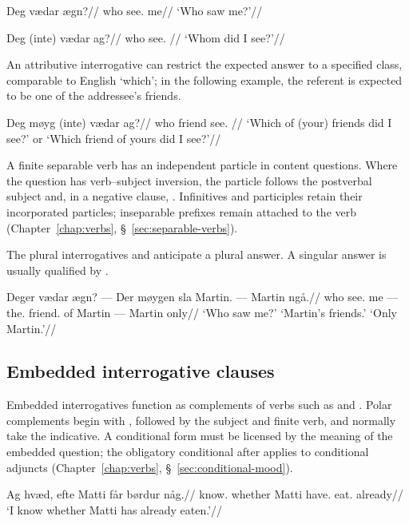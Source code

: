 \pex
\begingl
\gla Deg vædar ægn?//
\glb who see.\Pst{} me//
\glft `Who saw me?'//
\endgl
\xe

\pex
\begingl
\gla Deg (inte) vædar ag?//
\glb who \Q{} see.\Pst{} \First{}\Sg{}//
\glft `Whom did I see?'//
\endgl
\xe

An attributive interrogative can restrict the expected answer to a specified class, comparable to English `which'; in the following example, the referent is expected to be one of the addressee's friends.

\pex
\begingl
\gla Deg møyg (inte) vædar ag?//
\glb who friend \Q{} see.\Pst{} \First{}\Sg{}//
\glft `Which of (your) friends did I see?' or `Which friend of yours did I see?'//
\endgl
\xe

A finite separable verb has an independent particle in content questions. Where the question has verb--subject inversion, the particle follows the postverbal subject and, in a negative clause, . Infinitives and participles retain their incorporated particles; inseparable prefixes remain attached to the verb (Chapter~\ref{chap:verbs}, \S~\ref{sec:separable-verbs}).

The plural interrogatives  and  anticipate a plural answer. A singular answer is usually qualified by .

\pex
\begingl
\gla Deger vædar ægn? --- Der møygen sla Martin. --- Martin ngå.//
\glb who see.\Pst{} me --- the.\Pl{} friend.\Pl{} of Martin --- Martin only//
\glft `Who saw me?' `Martin's friends.' `Only Martin.'//
\endgl
\xe


\subsection{Embedded interrogative clauses}
\label{sec:embedded-interrogatives}

Embedded interrogatives function as complements of verbs such as  and . Polar complements begin with , followed by the subject and finite verb, and normally take the indicative. A conditional form must be licensed by the meaning of the embedded question; the obligatory conditional after  applies to conditional adjuncts (Chapter~\ref{chap:verbs}, \S~\ref{sec:conditional-mood}).

\pex
\begingl
\gla Ag hvæd, efte Matti får børdur någ.//
\glb \First{}\Sg{} know.\Pres{} whether Matti have.\Pres{} eat.\PstP{} already//
\glft `I know whether Matti has already eaten.'//
\endgl
\xe

